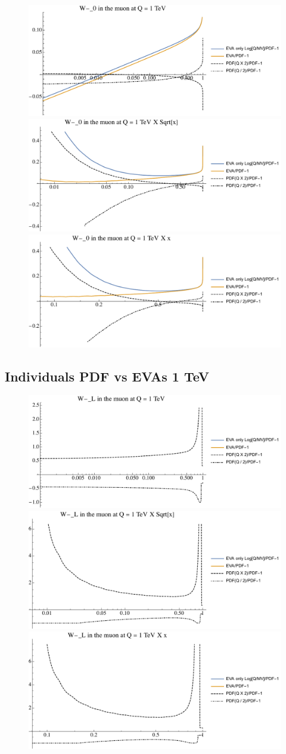 \documentclass[a4paper,11pt]{article}
\begin{document}
\begin{figure}[ht]
\includegraphics[width=0.46\linewidth]{Notebooks/PlotPDFs/ratios/1TeV/W-_0_Q.pdf}
\includegraphics[width=0.46\linewidth]{Notebooks/PlotPDFs/ratios/1TeV/W-_0_Qsqrtx.pdf}
\includegraphics[width=0.46\linewidth]{Notebooks/PlotPDFs/ratios/1TeV/W-_0_Qx.pdf}
\end{figure}

\clearpage
\subsection{Individuals PDF vs EVAs 1 TeV}

\begin{figure}[ht]
\includegraphics[width=0.46\linewidth]{Notebooks/PlotPDFs/ratios/1TeV/W-_L_Q.pdf}
\includegraphics[width=0.46\linewidth]{Notebooks/PlotPDFs/ratios/1TeV/W-_L_Qsqrtx.pdf}
\includegraphics[width=0.46\linewidth]{Notebooks/PlotPDFs/ratios/1TeV/W-_L_Qx.pdf}
\end{figure}
\end{document}
